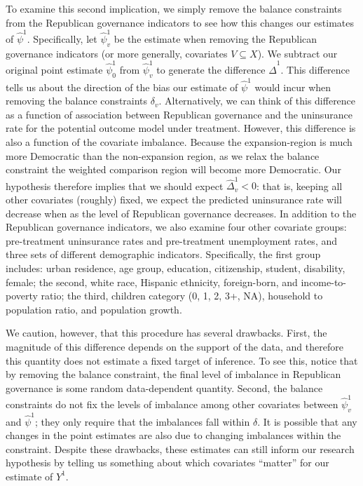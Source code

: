 \documentclass[aoas]{imsart}
\theoremstyle{plain}
\theoremstyle{remark}
\begin{document}
To examine this second implication, we simply remove the balance constraints from the Republican governance indicators to see how this changes our estimates of $\hat{\psi}^1$. Specifically, let $\hat{\psi}^1_v$ be the estimate when removing the Republican governance indicators (or more generally, covariates $V \subseteq X$). We subtract our original point estimate $\hat{\psi}^1_0$ from $\hat{\psi}^1_v$ to generate the difference $\hat{\Delta}^1$. This difference tells us about the direction of the bias our estimate of $\hat{\psi}^1$ would incur when removing the balance constraints $\delta_v$. Alternatively, we can think of this difference as a function of association between Republican governance and the uninsurance rate for the potential outcome model under treatment. However, this difference is also a function of the covariate imbalance. Because the expansion-region is much more Democratic than the non-expansion region, as we relax the balance constraint the weighted comparison region will become more Democratic. Our hypothesis therefore implies that we should expect $\hat{\Delta}_v^1 < 0$: that is, keeping all other covariates (roughly) fixed, we expect the predicted uninsurance rate will decrease when as the level of Republican governance decreases. In addition to the Republican governance indicators, we also examine four other covariate groups: pre-treatment uninsurance rates and pre-treatment unemployment rates, and three sets of different demographic indicators. Specifically, the first group includes: urban residence, age group, education, citizenship, student, disability, female; the second, white race, Hispanic ethnicity, foreign-born, and income-to-poverty ratio; the third, children category (0, 1, 2, 3+, NA), household to population ratio, and population growth.

We caution, however, that this procedure has several drawbacks. First, the magnitude of this difference depends on the support of the data, and therefore this quantity does not estimate a fixed target of inference. To see this, notice that by removing the balance constraint, the final level of imbalance in Republican governance is some random data-dependent quantity. Second, the balance constraints do not fix the levels of imbalance among other covariates between $\hat{\psi}^1_v$ and $\hat{\psi}^1$; they only require that the imbalances fall within $\delta$. It is possible that any changes in the point estimates are also due to changing imbalances within the constraint. Despite these drawbacks, these estimates can still inform our research hypothesis by telling us something about which covariates ``matter'' for our estimate of $Y^1$.
\end{document}
